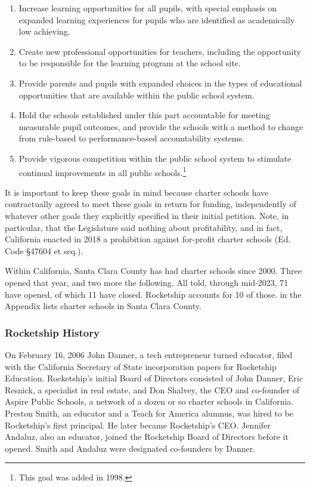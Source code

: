 \begin{enumerate}[label=\alph*)] %
  \item Increase learning opportunities for all pupils, with special emphasis on expanded learning experiences for
  pupils who are identified as academically low achieving.

  \item Create new professional opportunities for teachers, including the opportunity to be responsible for the learning program at the school site.
  \item Provide parents and pupils with expanded choices in the types of educational opportunities that are available within the public school system.
  \item Hold the schools established under this part accountable for meeting measurable pupil outcomes, and provide the schools with a method to change from rule-based to performance-based accountability systems.
  \item Provide vigorous competition within the public school system to stimulate continual improvements in all public schools.\footnote{This goal was added in 1998.}
\end{enumerate}

It is important to keep these goals in mind because charter schools have contractually agreed to meet these goals in return for funding, independently of whatever other goals they explicitly specified in their initial petition. Note, in particular, that the Legislature said nothing about profitability, and in fact, California enacted in 2018 a prohibition against for-profit charter schools (Ed. Code §47604 et seq.).

Within California, Santa Clara County has had charter schools since 2000. Three opened that year, and two more the following. All told, through mid-2023, 71 have opened, of which 11 have closed. Rocketship accounts for 10 of those.  in the Appendix lists charter schools in Santa Clara County.

\subsubsection{Rocketship History}\label{sec:history}\indent

On February 16, 2006 John Danner, a tech entrepreneur turned educator, filed with the California Secretary of State incorporation papers for Rocketship Education. Rocketship's initial Board of Directors consisted of John Danner, Eric Resnick, a specialist in real estate, and Don Shalvey, the CEO and co-founder of Aspire Public Schools, a network of a dozen or so charter schools in California. Preston Smith, an educator and a Teach for America alumnus, was hired to be Rocketship's first principal. He later became Rocketship's CEO. Jennifer Andaluz, also an educator, joined the Rocketship Board of Directors before it opened. Smith and Andaluz were designated co-founders by Danner.

